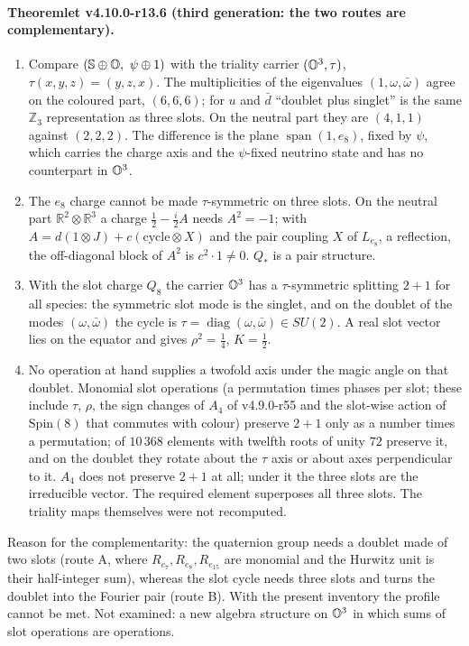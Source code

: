 \paragraph{Theoremlet v4.10.0-r13.6 (third generation: the two routes are complementary).}
\begin{enumerate}[leftmargin=2em]
\item[(a)] Compare \((\mathbb S\oplus\OO,\ \psi\oplus1)\) with the triality carrier \((\mathbb{O}^3,\tau)\), \(\tau(x,y,z)=(y,z,x)\).  The
multiplicities of the eigenvalues \((1,\omega,\bar\omega)\) agree on the coloured part, \((6,6,6)\); for \(u\) and \(\bar d\)
``doublet plus singlet'' is the same \(\mathbb Z_3\) representation as three slots.  On the neutral part they are \((4,1,1)\)
against \((2,2,2)\).  The difference is the plane \(\operatorname{span}(1,e_8)\), fixed by \(\psi\), which carries the charge axis and
the \(\psi\)-fixed neutrino state and has no counterpart in \(\mathbb{O}^3\).
\item[(b)] The \(e_8\) charge cannot be made \(\tau\)-symmetric on three slots.  On the neutral part
\(\mathbb R^2\otimes\mathbb R^3\) a charge \(\tfrac12-\tfrac i2A\) needs \(A^2=-1\); with \(A=d(1\otimes J)+c(\text{cycle}\otimes X)\) and
the pair coupling \(X\) of \(L_{e_8}\), a reflection, the off-diagonal block of \(A^2\) is \(c^2\cdot1\neq0\).  \(Q_*\) is a pair
structure.
\item[(c)] With the slot charge \(Q_8\) the carrier \(\mathbb{O}^3\) has a \(\tau\)-symmetric splitting \(2+1\) for all species: the
symmetric slot mode is the singlet, and on the doublet of the modes \((\omega,\bar\omega)\) the cycle is
\(\tau=\operatorname{diag}(\omega,\bar\omega)\in SU(2)\).  A real slot vector lies on the equator and gives \(\rho^2=\tfrac14\),
\(K=\tfrac12\).
\item[(d)] No operation at hand supplies a twofold axis under the magic angle on that doublet.  Monomial slot operations
(a permutation times phases per slot; these include \(\tau\), \(\rho\), the sign changes of \(A_4\) of v4.9.0-r55 and the
slot-wise action of \(\mathrm{Spin}(8)\) that commutes with colour) preserve \(2+1\) only as a number times a permutation; of
\(10\,368\) elements with twelfth roots of unity \(72\) preserve it, and on the doublet they rotate about the \(\tau\) axis or
about axes perpendicular to it.  \(A_4\) does not preserve \(2+1\) at all; under it the three slots are the irreducible
vector.  The required element superposes all three slots.  The triality maps themselves were not recomputed.
\end{enumerate}
Reason for the complementarity: the quaternion group needs a doublet made of two slots (route A, where
\(R_{e_7},R_{e_8},R_{e_{15}}\) are monomial and the Hurwitz unit is their half-integer sum), whereas the slot cycle needs
three slots and turns the doublet into the Fourier pair (route B).  With the present inventory the profile cannot be met.
Not examined: a new algebra structure on \(\mathbb{O}^3\) in which sums of slot operations are operations.

